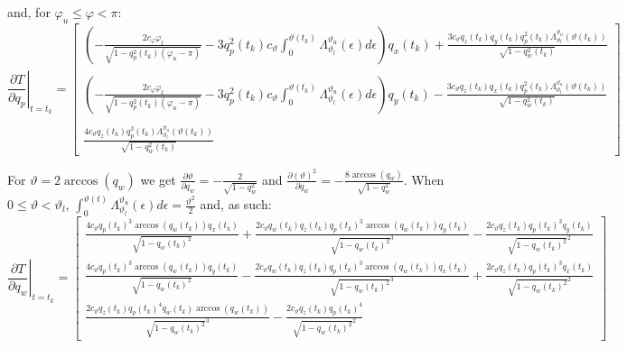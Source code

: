 \documentclass{article}
\begin{document}
		and, for $\varphi_u \leq \varphi < \pi$:
		\[
			\left .\frac{\partial T}{\partial q_p}\right |_{t=t_k}  = \begin{bmatrix}
												\left (-\frac{2 c_\varphi \varphi_l}{\sqrt{1-q_p^2(t_k)(\varphi_u-\pi)}} - 3 q_p^2(t_k) c_\vartheta \displaystyle \int_0^{\vartheta(t_k)}{\Lambda_{\vartheta_l}^{\vartheta_u}(\epsilon)} d\epsilon \right )q_x(t_k) + \displaystyle\frac{3 c_\vartheta q_z(t_k) q_y(t_k) q_p^2(t_k) \Lambda_{\vartheta_l}^{\vartheta_u}(\vartheta(t_k))}{\sqrt{1-q_w^2(t_k)}}  \\\\
												\left (-\frac{2 c_\varphi \varphi_l}{\sqrt{1-q_p^2(t_k)(\varphi_u-\pi)}} - 3 q_p^2(t_k) c_\vartheta \displaystyle \int_0^{\vartheta(t_k)}{\Lambda_{\vartheta_l}^{\vartheta_u}(\epsilon)} d\epsilon \right )q_y(t_k) - \displaystyle\frac{3 c_\vartheta q_z(t_k) q_x(t_k) q_p^2(t_k) \Lambda_{\vartheta_l}^{\vartheta_u}(\vartheta(t_k))}{\sqrt{1-q_w^2(t_k)}} \\\\
												\displaystyle \frac{4 c_\vartheta q_z(t_k) q_p^3(t_k) \Lambda_{\vartheta_l}^{\vartheta_u}(\vartheta(t_k))}{\sqrt{1-q_w^2(t_k)}}
											   \end{bmatrix}
		\] 
		
		For $\vartheta = 2\arccos(q_w)$ we get $\frac{\partial \vartheta}{\partial q_w} = -\frac{2}{\sqrt{1-q_w^2}}$ and $\frac{\partial (\vartheta)^2}{\partial q_w} = -\frac{8\arccos(q_w)}{\sqrt{1-q_w^2}}$. When $0 \leq \vartheta < \vartheta_l$, $\int_0^{\vartheta(t)}{\Lambda_{\vartheta_l}^{\vartheta_u}(\epsilon)} d\epsilon = \frac{\vartheta^2}{2}$ and, as such:
		\[
			\left .\frac{\partial T}{\partial q_w}\right |_{t=t_k}  = \begin{bmatrix}
											\frac{4 c_{\vartheta}q_p(t_k)^3 \arccos(q_w(t_k)) q_x(t_k)}{\sqrt{1-q_w(t_k)^2}} + \frac{2c_{\vartheta} q_w(t_k) q_z(t_k) q_p(t_k)^3 \arccos(q_w(t_k)) q_y(t_k)}{\sqrt{1-q_w(t_k)^2}^3} - \frac{2 c_\vartheta q_z(t_k) q_p(t_k)^3 q_y(t_k)}{\sqrt{1-q_w(t_k)^2}^2}\\
											\frac{4 c_{\vartheta}q_p(t_k)^3 \arccos(q_w(t_k)) q_y(t_k)}{\sqrt{1-q_w(t_k)^2}} - \frac{2c_{\vartheta} q_w(t_k) q_z(t_k) q_p(t_k)^3 \arccos(q_w(t_k)) q_x(t_k)}{\sqrt{1-q_w(t_k)^2}^3} + \frac{2 c_\vartheta q_z(t_k) q_p(t_k)^3 q_x(t_k)}{\sqrt{1-q_w(t_k)^2}^2}\\
											\frac{2 c_{\vartheta} q_z(t_k) q_p(t_k)^4 q_w(t_k) \arccos(q_w(t_k))}{\sqrt{1-q_w(t_k)^2}^3} - \frac{2c_{\vartheta} q_z(t_k) q_p(t_k)^4}{\sqrt{1-q_w(t_k)^2}^2}
										\end{bmatrix} 
		\]
		
\end{document}

